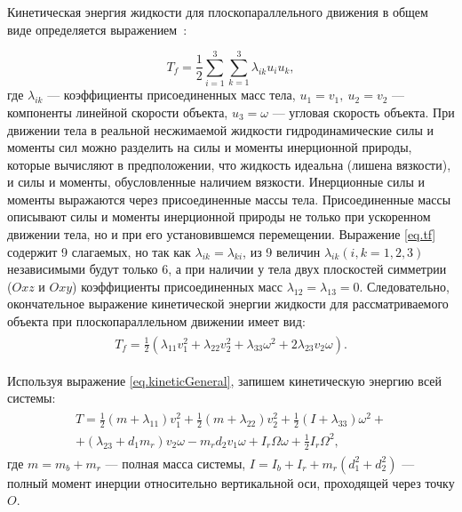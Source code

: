 Кинетическая энергия жидкости для плоскопараллельного движения в общем виде определяется выражением~\cite{Korotkin}:

\begin{equation}
T_f = \frac{1}{2} \sum_{i=1}^{3}\sum_{k=1}^{3} {\lambda_{ik}u_i u_k},
\label{eq.tf}
\end{equation}
где $ \lambda_{ik} $ --- коэффициенты присоединенных масс тела, $ u_1 = v_1, \ u_2 = v_2 $ --- компоненты линейной скорости объекта, $ u_3 = \omega $ --- угловая скорость объекта. При движении тела в реальной несжимаемой жидкости гидродинамические силы и моменты сил можно разделить на силы и моменты инерционной природы, которые вычисляют в предположении, что жидкость идеальна (лишена вязкости), и силы и моменты, обусловленные наличием вязкости. Инерционные силы и моменты выражаются через присоединенные массы тела. Присоединенные массы описывают силы и моменты инерционной природы не только при ускоренном движении тела, но и при его установившемся перемещении.	Выражение \eqref{eq.tf} содержит 9 слагаемых, но так как $ \lambda_{ik} = \lambda_{ki} $, из 9 величин $ \lambda_{ik} (i,k=1,2,3)$ независимыми будут только 6, а при наличии у тела двух плоскостей симметрии ($Oxz$ и $Oxy$) коэффициенты присоединенных масс $ \lambda_{12} = \lambda_{13} = 0 $. Следовательно, окончательное выражение кинетической энергии жидкости для рассматриваемого объекта при плоскопараллельном движении имеет вид:
\begin{gather*}
\begin{gathered}
T_f = \frac{1}{2} ( \lambda_{11}v_1^2 + \lambda_{22}v_2^2 + \lambda_{33}\omega^2 + 2\lambda_{23}v_2\omega  ).
\end{gathered}
\end{gather*}

Используя выражение \eqref{eq.kineticGeneral}, запишем кинетическую энергию всей системы:
\begin{gather}
\begin{gathered}
T = \frac{1}{2}(m+\lambda_{11})v_1^2 + \frac{1}{2}(m+\lambda_{22})v_2^2 + \frac{1}{2}(I+\lambda_{33})\omega^2 + \\
+ (\lambda_{23} +  d_1m_r)v_2\omega - m_r d_2 v_1 \omega + I_r\Omega\omega + \frac{1}{2}I_r\Omega^2 , %
\end{gathered}
\label{eq.kinetic}
\end{gather}
где $ m= m_b + m_r$ --- полная масса системы, $ I = I_b + I_r + m_r(d_1^2+d_2^2) $ --- полный момент инерции относительно вертикальной оси, проходящей через точку $ O $.


